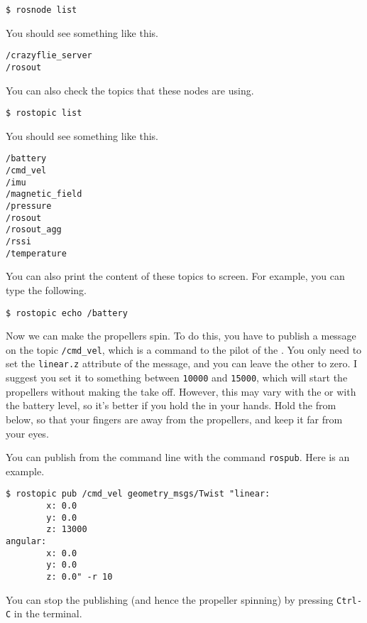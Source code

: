 \begin{Verbatim}[fontsize=\small]
$ rosnode list
\end{Verbatim}

You should see something like this.

\begin{Verbatim}[fontsize=\small]
/crazyflie_server
/rosout
\end{Verbatim}

You can also check the \ROS{} topics that these nodes are using.

\begin{Verbatim}[fontsize=\small]
$ rostopic list
\end{Verbatim}

You should see something like this.

\begin{Verbatim}[fontsize=\small]
/battery
/cmd_vel
/imu
/magnetic_field
/pressure
/rosout
/rosout_agg
/rssi
/temperature
\end{Verbatim}

You can also print the content of these topics to screen.
For example, you can type the following.

\begin{Verbatim}[fontsize=\small]
$ rostopic echo /battery
\end{Verbatim}

Now we can make the propellers spin.
To do this, you have to publish a message on the topic \verb|/cmd_vel|, which is a command to the pilot of the \CF{}.
You only need to set the \texttt{linear.z} attribute of the message, and you can leave the other to zero.
I suggest you set it to something between \texttt{10000} and \texttt{15000}, which will start the propellers without making the \CF{} take off.
However, this may vary with the \CF{} or with the battery level, so it's better if you hold the \CF{} in your hands.
Hold the \CF{} from below, so that your fingers are away from the propellers, and keep it far from your eyes.

You can publish from the command line with the command \texttt{rospub}.
Here is an example.

\begin{Verbatim}[fontsize=\small]
$ rostopic pub /cmd_vel geometry_msgs/Twist "linear:
        x: 0.0
        y: 0.0
        z: 13000
angular:
        x: 0.0
        y: 0.0
        z: 0.0" -r 10
\end{Verbatim}

You can stop the publishing (and hence the propeller spinning) by pressing \verb|Ctrl-C| in the terminal.

